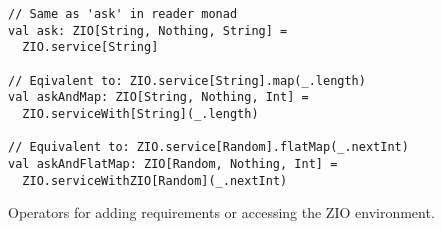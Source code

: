 \begin{algorithm}

\begin{verbatim}
// Same as 'ask' in reader monad
val ask: ZIO[String, Nothing, String] =
  ZIO.service[String]

// Eqivalent to: ZIO.service[String].map(_.length)
val askAndMap: ZIO[String, Nothing, Int] =
  ZIO.serviceWith[String](_.length)

// Equivalent to: ZIO.service[Random].flatMap(_.nextInt)
val askAndFlatMap: ZIO[Random, Nothing, Int] =
  ZIO.serviceWithZIO[Random](_.nextInt)
\end{verbatim}

\caption{Operators for adding requirements or accessing the ZIO environment. \label{zio:environment-access}}
\end{algorithm}